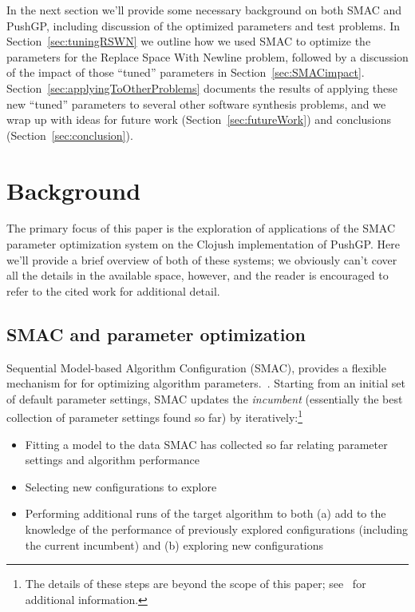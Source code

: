 In the next section we'll provide some necessary background on both SMAC
and PushGP, including discussion of the optimized parameters and test
problems. In Section~\ref{sec:tuningRSWN} we outline how we 
used SMAC to optimize the parameters for the Replace Space With Newline
problem, followed by a discussion of the impact of those ``tuned''
parameters in Section~\ref{sec:SMACimpact}. 
Section~\ref{sec:applyingToOtherProblems} documents the results of
applying these new ``tuned'' parameters to several other software
synthesis problems, and we wrap up with ideas for future work
(Section~\ref{sec:futureWork}) and conclusions (Section~\ref{sec:conclusion}).

\section{Background}
\label{sec:background}

The primary focus of this paper is the exploration of applications of the SMAC
parameter optimization system on the Clojush implementation of
PushGP. Here we'll provide a brief overview of both of these systems; we
obviously can't cover all the details in the available space, however, and the
reader is encouraged to refer to the cited work for additional detail.

\subsection{SMAC and parameter optimization}
\label{sec:SMACbackground}

Sequential Model-based Algorithm Configuration (SMAC),
provides a flexible mechanism for for optimizing algorithm 
parameters.~\cite{HutHooLey11-SMAC}. Starting from an initial set of default
parameter settings, SMAC updates the \emph{incumbent} (essentially the
best collection of parameter settings found so far) by 
iteratively:\footnote{The details of these steps are beyond the scope of this 
	paper; see~\cite{HutHooLey11-SMAC} for additional information.}
\begin{itemize}
	\item Fitting a model to the data SMAC has collected so far relating 
	parameter settings and algorithm performance
	\item Selecting new configurations to explore
	\item Performing additional runs of the target algorithm to both (a)
	add to the knowledge of the performance of previously explored
	configurations (including the current incumbent) and
	(b) exploring new configurations
\end{itemize}

